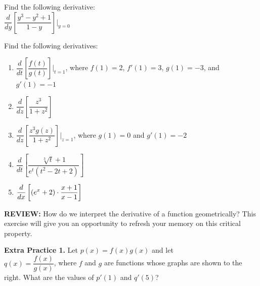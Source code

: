 \documentclass[10pt]{article}
\begin{document}
{} Find the following derivative:\\

$\dfrac{d}{dy}\left[ \dfrac{y^3-y^2+1}{1-y} \right]\bigg|_{y=0}$

\vfill

{} Find the following derivatives:\\

\begin{enumerate}[label=(\alph*)]
\item$\dfrac{d}{dt}\left[ \dfrac{f(t)}{g(t)} \right]\bigg|_{t=1}$, where $f(1)=2$, $f'(1)=3$, $g(1)=-3$, and $g'(1)=-1$

\vfill

\item $\dfrac{d}{dz}\left[ \dfrac{z^3}{1+z^2} \right]$

\vfill

\newpage%

\item $\dfrac{d}{dz}\left[ \dfrac{z^3g(z)}{1+z^2} \right]\bigg|_{z=1}$, where $g(1)=0$ and $g'(1)=-2$


\item $\dfrac{d}{dt}\left[ \dfrac{\sqrt[3]{t}+1}{e^t(t^2-2t+2)} \right]$

\item $\displaystyle \frac{d}{dx}\left[(e^x+2)\cdot \frac{x+1}{x-1}\right]$

\end{enumerate}
\newpage 
{\bf REVIEW:} How do we interpret the derivative of a function geometrically? This exercise will give you an opportunity to refresh your memory on this critical property.

\begin{minipage}[t]{0.55\textwidth}
{\bf\color{blue} Extra Practice 1.} %
Let $p(x)=f(x)g(x)$ and let\\ $q(x)=\dfrac{f(x)}{g(x)}$, where $f$ and $g$ are functions whose graphs are shown to the right. What are the values of $p'(1)$ and $q'(5)$? \\
\end{minipage}
\hfill
\begin{minipage}[t]{0.4\textwidth}
\,
\begin{center}
\end{center}
\end{minipage}
\end{document}
